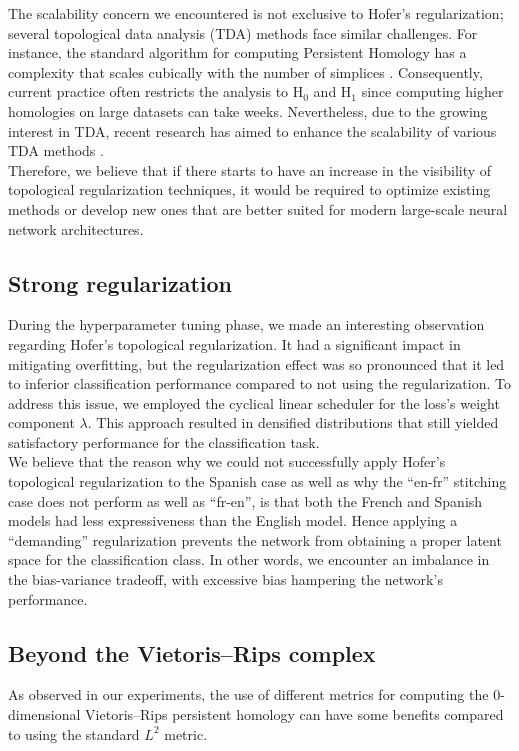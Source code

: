 \documentclass[../main.tex]{subfiles}
\begin{document}
The scalability concern we encountered is not exclusive to Hofer's regularization; several topological data analysis (TDA) methods face similar challenges. For instance, the standard algorithm for computing Persistent Homology has a complexity that scales cubically with the number of simplices \cite{akcora_reduction_2022}. Consequently, current practice often restricts the analysis to $\text{H}_0$ and $\text{H}_1$ since computing higher homologies on large datasets can take weeks. Nevertheless, due to the growing interest in TDA, recent research has aimed to enhance the scalability of various TDA methods \cite{akcora_reduction_2022, polianskii_breaking_2022}.\\

Therefore, we believe that if there starts to have an increase in the visibility of topological regularization techniques, it would be required to optimize existing methods or develop new ones that are better suited for modern large-scale neural network architectures.

\subsection{Strong regularization}

During the hyperparameter tuning phase, we made an interesting observation regarding Hofer's topological regularization. It had a significant impact in mitigating overfitting, but the regularization effect was so pronounced that it led to inferior classification performance compared to not using the regularization. To address this issue, we employed the cyclical linear scheduler for the loss's weight component $\lambda$. This approach resulted in densified distributions that still yielded satisfactory performance for the classification task.\\


We believe that the reason why we could not successfully apply Hofer's topological regularization to the Spanish case as well as why the ``en-fr'' stitching case does not perform as well as ``fr-en'', is that both the French and Spanish models had less expressiveness than the English model. Hence applying a ``demanding'' regularization prevents the network from obtaining a proper latent space for the classification class. In other words, we encounter an imbalance in the bias-variance tradeoff, with excessive bias hampering the network's performance.


\subsection{Beyond the Vietoris–Rips complex}
As observed in our experiments, the use of different metrics for computing the 0-dimensional Vietoris–Rips persistent homology can have some benefits compared to using the standard $L^2$ metric.
\end{document}
